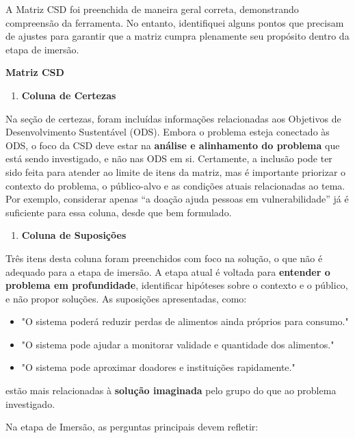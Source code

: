\documentclass[
  sigconf,
  nonacm, %
  language=portuguese
]{acmart}
\begin{document}
A Matriz CSD foi preenchida de maneira geral correta, demonstrando compreensão da ferramenta. No entanto, identifiquei alguns pontos que precisam de ajustes para garantir que a matriz cumpra plenamente seu propósito dentro da etapa de imersão.

\textbf{Matriz CSD}

\begin{enumerate}[leftmargin=14pt,itemsep=2pt,topsep=4pt]
  \item \textbf{Coluna de Certezas}
\end{enumerate}

Na seção de certezas, foram incluídas informações relacionadas aos Objetivos de Desenvolvimento Sustentável (ODS). Embora o problema esteja conectado às ODS, o foco da CSD deve estar na \textbf{análise e alinhamento do problema} que está sendo investigado, e não nas ODS em si. Certamente, a inclusão pode ter sido feita para atender ao limite de itens da matriz, mas é importante priorizar o contexto do problema, o público-alvo e as condições atuais relacionadas ao tema. Por exemplo, considerar apenas “a doação ajuda pessoas em vulnerabilidade” já é suficiente para essa coluna, desde que bem formulado.

\begin{enumerate}[leftmargin=14pt,itemsep=2pt,topsep=4pt]
  \item \textbf{Coluna de Suposições}
\end{enumerate}

Três itens desta coluna foram preenchidos com foco na solução, o que não é adequado para a etapa de imersão. A etapa atual é voltada para \textbf{entender o problema em profundidade}, identificar hipóteses sobre o contexto e o público, e não propor soluções. As suposições apresentadas, como:

\begin{itemize}[leftmargin=14pt,itemsep=2pt,topsep=4pt]
  \item "O sistema poderá reduzir perdas de alimentos ainda próprios para consumo."
  \item "O sistema pode ajudar a monitorar validade e quantidade dos alimentos."
  \item "O sistema pode aproximar doadores e instituições rapidamente."
\end{itemize}

estão mais relacionadas à \textbf{solução imaginada} pelo grupo do que ao problema investigado.

Na etapa de Imersão, as perguntas principais devem refletir:
\end{document}
